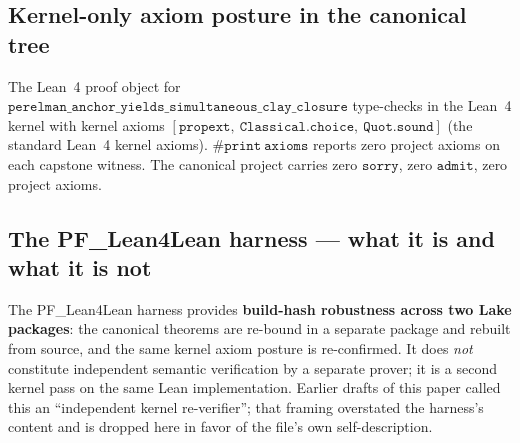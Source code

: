 \documentclass[11pt,a4paper]{article}
\theoremstyle{plain}
\theoremstyle{definition}
\begin{document}
\subsection{Kernel-only axiom posture in the canonical tree}
\label{sec:lean-kernel}

The Lean~4 proof object for
$\mathtt{perelman\_anchor\_yields\_simultaneous\_clay\_closure}$
type-checks in the Lean~4 kernel with kernel axioms
$\mathtt{[propext,\ Classical.choice,\ Quot.sound]}$ (the
standard Lean~4 kernel axioms). $\mathtt{\#print\ axioms}$
reports zero project axioms on each capstone witness. The
canonical project carries zero $\mathtt{sorry}$, zero
$\mathtt{admit}$, zero project axioms.

\subsection{The PF\_Lean4Lean harness --- what it is and what it
is not}
\label{sec:l4l-honest}

\noindent{}

\medskip

\noindent
The PF\_Lean4Lean harness provides \textbf{build-hash robustness
across two Lake packages}: the canonical theorems are re-bound in
a separate package and rebuilt from source, and the same kernel
axiom posture is re-confirmed. It does \emph{not} constitute
independent semantic verification by a separate prover; it is a
second kernel pass on the same Lean implementation. Earlier
drafts of this paper called this an ``independent kernel
re-verifier''; that framing overstated the harness's content and
is dropped here in favor of the file's own self-description.
\end{document}
